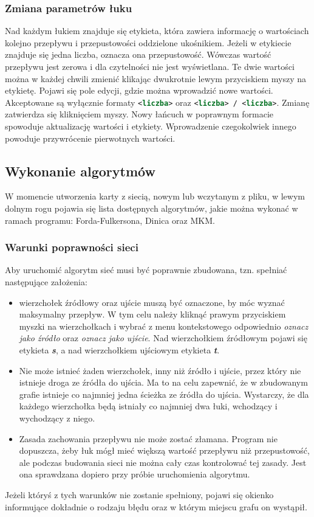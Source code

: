 \subsubsection{Zmiana parametrów łuku}
Nad każdym łukiem znajduje się etykieta, która zawiera informację o wartościach kolejno przepływu i przepustowości oddzielone ukośnikiem. Jeżeli w etykiecie znajduje się jedna liczba, oznacza ona przepustowość. Wówczas wartość przepływu jest zerowa i dla czytelności nie jest wyświetlana. Te dwie wartości można w każdej chwili zmienić klikając dwukrotnie lewym przyciskiem myszy na etykietę. Pojawi się pole edycji, gdzie można wprowadzić nowe wartości. Akceptowane są wyłącznie formaty \lstinline[language=xml]|<liczba>| oraz  \lstinline[language=xml]|<liczba> / <liczba>|. Zmianę zatwierdza się kliknięciem myszy. Nowy łańcuch w poprawnym formacie spowoduje aktualizację wartości i etykiety. Wprowadzenie czegokolwiek innego powoduje przywrócenie pierwotnych wartości.
\subsection{Wykonanie algorytmów}
W momencie utworzenia karty z siecią, nowym lub wczytanym z pliku, w lewym dolnym rogu pojawia się lista dostępnych algorytmów, jakie można wykonać w ramach programu: Forda-Fulkersona, Dinica oraz MKM.
\subsubsection{Warunki poprawności sieci}
Aby uruchomić algorytm sieć musi być poprawnie zbudowana, tzn. spełniać następujące założenia:
\begin{itemize}
	\item wierzchołek źródłowy oraz ujście muszą być oznaczone, by móc wyznać maksymalny przepływ. W tym celu należy kliknąć prawym przyciskiem myszki na wierzchołkach i wybrać z menu kontekstowego odpowiednio \textit{oznacz jako źródło} oraz \textit{oznacz jako ujście}. Nad wierzchołkiem źródłowym pojawi się etykieta \textit{\textbf{s}}, a nad wierzchołkiem ujściowym etykieta \textit{\textbf{t}}.
	\item Nie może istnieć żaden wierzchołek, inny niż źródło i ujście, przez który nie istnieje droga ze źródła do ujścia. Ma to na celu zapewnić, że w zbudowanym grafie istnieje co najmniej jedna ścieżka ze źródła do ujścia. Wystarczy, że dla każdego wierzchołka będą istniały co najmniej dwa łuki, wchodzący i wychodzący z niego.
	\item Zasada zachowania przepływu nie może zostać złamana. Program nie dopuszcza, żeby łuk mógł mieć większą wartość przepływu niż przepustowość, ale podczas budowania sieci nie można cały czas kontrolować tej zasady. Jest ona sprawdzana dopiero przy próbie uruchomienia algorytmu.
\end{itemize}
Jeżeli któryś z tych warunków nie zostanie spełniony, pojawi się okienko informujące dokładnie o rodzaju błędu oraz w którym miejscu grafu on wystąpił.

